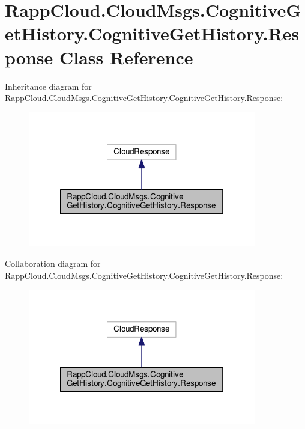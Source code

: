 \hypertarget{classRappCloud_1_1CloudMsgs_1_1CognitiveGetHistory_1_1CognitiveGetHistory_1_1Response}{\section{Rapp\-Cloud.\-Cloud\-Msgs.\-Cognitive\-Get\-History.\-Cognitive\-Get\-History.\-Response Class Reference}
\label{classRappCloud_1_1CloudMsgs_1_1CognitiveGetHistory_1_1CognitiveGetHistory_1_1Response}
}


Inheritance diagram for Rapp\-Cloud.\-Cloud\-Msgs.\-Cognitive\-Get\-History.\-Cognitive\-Get\-History.\-Response\-:
\nopagebreak
\begin{figure}[H]
\begin{center}
\leavevmode
\includegraphics[width=282pt]{classRappCloud_1_1CloudMsgs_1_1CognitiveGetHistory_1_1CognitiveGetHistory_1_1Response__inherit__graph}
\end{center}
\end{figure}


Collaboration diagram for Rapp\-Cloud.\-Cloud\-Msgs.\-Cognitive\-Get\-History.\-Cognitive\-Get\-History.\-Response\-:
\nopagebreak
\begin{figure}[H]
\begin{center}
\leavevmode
\includegraphics[width=282pt]{classRappCloud_1_1CloudMsgs_1_1CognitiveGetHistory_1_1CognitiveGetHistory_1_1Response__coll__graph}
\end{center}
\end{figure}
